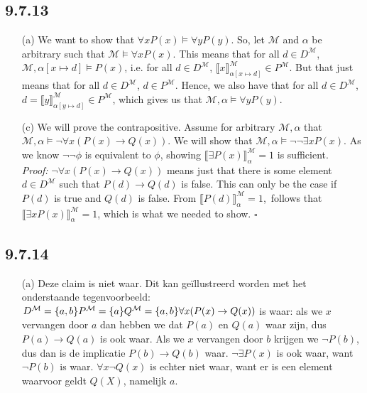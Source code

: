 \subsection*{9.7.13}

\begin{enumerate}

\item[(a)] We want to show that $\forall x P(x)\vDash \forall
  yP(y)$. So, let $\mathcal{M}$ and $\alpha$ be arbitrary such that
  $\mathcal{M}\vDash\forall xP(x)$. This means that for all $d\in
  D^\mathcal{M}$, $\mathcal{M},\alpha[x\mapsto d]\vDash P(x)$,
  i.e. for all $d\in D^\mathcal{M}$, $\llbracket
  x\rrbracket^\mathcal{M}_{\alpha[x\mapsto d]}\in P^\mathcal{M}$. But
  that just means that for all $d\in D^\mathcal{M}$, $d\in
  P^\mathcal{M}$. Hence, we also have that for all $d\in
  D^\mathcal{M}$,   $d=\llbracket
  y\rrbracket^\mathcal{M}_{\alpha[y\mapsto d]}\in P^\mathcal{M}$,
  which gives us that $\mathcal{M},\alpha\vDash\forall y P(y)$.
  
\item[(c)] We will prove the contrapositive. Assume for arbitrary $\mathcal{M}, \alpha$ that $\mathcal{M}, \alpha \vDash \neg \forall x (P(x) \rightarrow Q(x))$. We will show that $\mathcal{M}, \alpha \vDash \neg \neg \exists x P(x)$. As we know $\neg \neg \phi$ is equivalent to $\phi$, showing $\llbracket\exists P(x)\rrbracket_\alpha^\mathcal{M} =1$ is sufficient.\\\textit{Proof:} $\neg \forall x (P(x) \rightarrow Q(x)) $ means just that there is some element $d \in D^\mathcal{M}$ such that $P(d) \rightarrow Q(d)$ is false. This can only be the case if $P(d)$ is true and $Q(d)$ is false. From $\llbracket P(d)\rrbracket_\alpha^\mathcal{M}=1$,\ follows that $\llbracket \exists x P(x)\rrbracket_\alpha^\mathcal{M} =1$, which is what we needed to show. $\square$

\end{enumerate}


    

\subsection*{9.7.14}
\begin{enumerate}
    \item[(a)] Deze claim is niet waar. Dit kan geïllustreerd worden met het onderstaande tegenvoorbeeld:\\
    $ D^\mathcal{M} = \{a,b\} \\
    P^\mathcal{M} = \{a\} \\
    Q^\mathcal{M} = \{a,b\}
    \\ \forall x (P(x)\rightarrow Q(x))$ is waar: als we $x$ vervangen door $a$ dan hebben we dat $P(a)$ en $Q(a)$ waar zijn, dus $P(a)\rightarrow Q(a)$ is ook waar. Als we $x$ vervangen door $b$ krijgen we $\neg P(b)$, dus dan is de implicatie $P(b)\rightarrow Q(b)$ waar. $\neg \exists P(x)$ is ook waar, want $\neg P(b)$ is waar. $\forall x \neg Q(x)$ is echter niet waar, want er is een element waarvoor geldt $Q(X)$, namelijk $a$. 
\end{enumerate}
	
